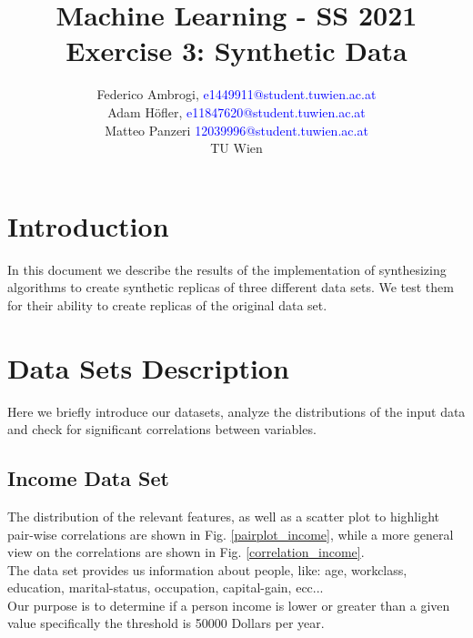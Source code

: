 \documentclass{article}
\begin{document}
\title{ Machine Learning - SS 2021 \\ Exercise 3: Synthetic Data }


	\author{Federico Ambrogi, \textcolor{blue} {e1449911@student.tuwien.ac.at } \\
	Adam Höfler, \textcolor{blue} {e11847620@student.tuwien.ac.at } \\
	Matteo Panzeri \textcolor{blue}{12039996@student.tuwien.ac.at } \\
    TU Wien }






\maketitle
\setcounter{tocdepth}{2}
\tableofcontents

\section*{Introduction}
In this document we describe the results of the implementation of synthesizing algorithms to create synthetic replicas of three different data sets. We test them for their ability to create replicas of the original data set.



\section{Data Sets Description}
Here we briefly introduce our datasets, analyze the distributions of the input data and check for significant correlations between variables.


\subsection{Income Data Set}
The distribution of the relevant features, as well as a scatter plot to highlight pair-wise correlations are shown in Fig. \ref{pairplot_income}, while a more general view on the correlations are shown in Fig. \ref{correlation_income}.\\
The data set \cite{income} provides us information about people, like: age, workclass, education, marital-status, occupation, capital-gain, ecc...\\
Our purpose is to determine if a person income is lower or greater than a given value specifically the threshold is 50000 Dollars per year.
\end{document}
